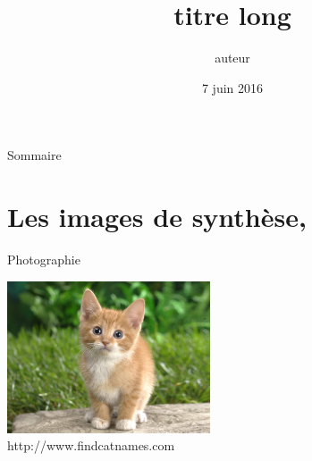 \documentclass[10pt]{beamer}
\title[titre court] {titre long}
\author{auteur}
\institute{LISIC, ULCO}
\date{7 juin 2016}
\begin{document}
\begin{frame}
  \maketitle
\end{frame}

\begin{frame}{\large Sommaire}
  \tableofcontents
\end{frame}


\section{Les images de synthèse,}

\begin{frame}{\large \insertsection}
  \begin{block}{Photographie}
      \begin{center}
          \includegraphics[width=6cm]{images/chaton.jpg}
          \\ http://www.findcatnames.com
      \end{center}
  \end{block} 
\end{frame}
\end{document}

